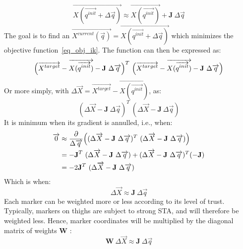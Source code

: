 \begin{equation}
      \overrightarrow{X(\overrightarrow{q^{init}}+\Delta\overrightarrow{q})} 
      \approx \overrightarrow{X(\overrightarrow{q^{init}})} + \textbf{J} \ \Delta\overrightarrow{q}
\end{equation} 
The goal is to find an $\overrightarrow{X^{current}(\overrightarrow{q})} = \overrightarrow{X(\overrightarrow{q^{init}}+\Delta\overrightarrow{q})}$ which minimizes the objective function~\ref{eq_obj_ik}. The function can then be expressed as:
\begin{equation}
  \Bigl(\overrightarrow{X^{target}} - \overrightarrow{X(\overrightarrow{q^{init}})} - \textbf{J} \ \Delta\overrightarrow{q} \Bigr)^T \ 
  \Bigl(\overrightarrow{X^{target}} - \overrightarrow{X(\overrightarrow{q^{init}})} - \textbf{J} \ \Delta\overrightarrow{q} \Bigr)
\end{equation}
Or more simply, with $\Delta\overrightarrow{X} = \overrightarrow{X^{target}} - \overrightarrow{X(\overrightarrow{q^{init}})}$, as:
\begin{equation}
  (\Delta\overrightarrow{X} - \textbf{J} \ \Delta\overrightarrow{q} )^T \ 
  (\Delta\overrightarrow{X} - \textbf{J} \ \Delta\overrightarrow{q} )
\end{equation}
It is minimum when its gradient is annulled, i.e., when:
\begin{equation}
  \begin{aligned}
   \overrightarrow{0} &\approx 
   \frac{\partial}{\Delta \overrightarrow{q}}
   \Bigl( ( \Delta\overrightarrow{X} - \textbf{J} \ \Delta\overrightarrow{q})^T \ 
  (\Delta\overrightarrow{X} - \textbf{J} \ \Delta\overrightarrow{q} ) \Bigr)  \\
  & = - \textbf{J}^T \ 
  (\Delta\overrightarrow{X} - \textbf{J} \ \Delta\overrightarrow{q} ) 
  + (\Delta\overrightarrow{X} - \textbf{J} \ \Delta\overrightarrow{q} )^T 
  (-\textbf{J})\\
  & = -2 \textbf{J}^T \ 
  (\Delta\overrightarrow{X} - \textbf{J} \ \Delta\overrightarrow{q} )
  \end{aligned}
\end{equation}
Which is when:
\begin{equation}
  \Delta\overrightarrow{X} \approx \textbf{J} \ \Delta\overrightarrow{q}
\end{equation}
Each marker can be weighted more or less according to its level of trust. Typically, markers on thighs are subject to strong STA, and will therefore be weighted less. Hence, marker coordinates will be multiplied by the diagonal matrix of weights \textbf{W} \cite{Meredith2005}:
\begin{equation}
  \boxed{
  \textbf{W} \ \Delta\overrightarrow{X} \approx \textbf{J} \ \Delta\overrightarrow{q}
  }
\end{equation}

